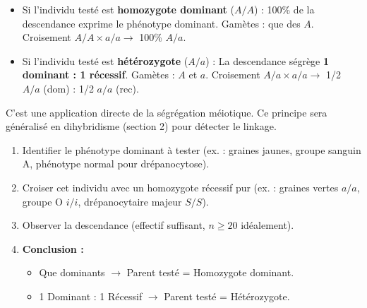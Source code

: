 \documentclass[11pt]{article}
\begin{document}
\begin{propriete}
\begin{itemize}
    \item Si l'individu testé est \textbf{homozygote dominant} ($A/A$) : 100\% de la descendance exprime le phénotype dominant. Gamètes : que des $A$. Croisement $A/A \times a/a \rightarrow$ 100\% $A/a$.
    \item Si l'individu testé est \textbf{hétérozygote} ($A/a$) : La descendance ségrège \textbf{1 dominant : 1 récessif}. Gamètes : $A$ et $a$. Croisement $A/a \times a/a \rightarrow$ 1/2 $A/a$ (dom) : 1/2 $a/a$ (rec).
\end{itemize}
C'est une application directe de la ségrégation méiotique. Ce principe sera généralisé en dihybridisme (section 2) pour détecter le linkage.
\end{propriete}

\begin{methode}
\begin{enumerate}
    \item Identifier le phénotype dominant à tester (ex. : graines jaunes, groupe sanguin A, phénotype normal pour drépanocytose).
    \item Croiser cet individu avec un homozygote récessif pur (ex. : graines vertes $a/a$, groupe O $i/i$, drépanocytaire majeur $S/S$).
    \item Observer la descendance (effectif suffisant, $n \ge 20$ idéalement).
    \item \textbf{Conclusion :}
    \begin{itemize}
        \item Que dominants $\rightarrow$ Parent testé = Homozygote dominant.
        \item 1 Dominant : 1 Récessif $\rightarrow$ Parent testé = Hétérozygote.
    \end{itemize}
\end{enumerate}
\end{methode}
\end{document}
